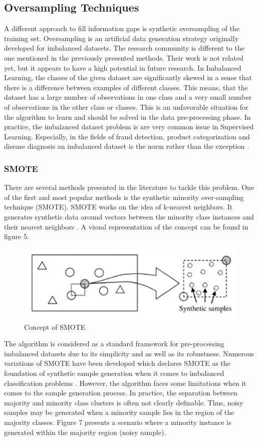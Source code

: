 \documentclass[parskip=full]{scrartcl}
\begin{document}
\subsection{Oversampling Techniques}

A different approach to fill information gaps is synthetic oversampling of the
training set. Oversampling is an artificial data generation strategy originally
developed for imbalanced datasets. The research community is different to the
one mentioned in the previously presented methods. Their work is not related
yet, but it appears to have a high potential in future research. In Imbalanced
Learning, the classes of the given dataset are significantly skewed in a sense
that there is a difference between examples of different classes. This means,
that the dataset has a large number of observations in one class and a very
small number of observations in the other class or classes. This is an
unfavorable situation for the algorithm to learn and should be solved in the
data pre-processing phase. In practice, the imbalanced dataset problem is are
very common issue in Supervised Learning. Especially, in the fields of fraud
detection, product categorization and disease diagnosis an imbalanced dataset is
the norm rather than the exception \cite{He.2013}. 

\subsubsection{SMOTE}

There are several methods presented in the literature to tackle this problem.
One of the first and most popular methods is the synthetic minority
over-sampling technique (SMOTE). SMOTE works on the idea of k-nearest
neighbors. It generates synthetic data around vectors between the minority
class instances and their nearest neighbors \cite{Chawla.2002}. A visual
representation of the concept can be found in figure 5.

\begin{figure}[h]
	\centering
	\includegraphics[width=0.5\linewidth]{./Resources/smote}
	\caption{Concept of SMOTE}
	\label{fig:smote}
\end{figure}

The algorithm is considered as a standard framework for pre-processing
imbalanced datasets due to its simplicity and as well as its robustness.
Numerous variations of SMOTE have been developed which declares SMOTE as the
foundation of synthetic sample generation when it comes to imbalanced
classification problems \cite{Fernandez.2018}. However, the algorithm faces some
limitations when it comes to the sample generation process. In practice, the
separation between majority and minority class clusters is often not clearly
definable. Thus, noisy samples may be generated when a minority sample lies in
the region of the majority classes. Figure 7 presents a scenario where a
minority instance is generated within the majority region (noisy sample).
\end{document}
